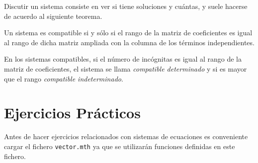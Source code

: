 \documentclass[a4paper]{article}
\begin{document}
Discutir un sistema consiste en ver si tiene soluciones y cuántas, y suele hacerse de acuerdo al siguiente teorema.

\begin{teorema}
Un sistema es compatible si y sólo si el rango de la matriz de coeficientes es igual al rango de dicha matriz ampliada con la columna de los términos independientes. 

En los sistemas compatibles, si el número de incógnitas es igual al rango de la matriz de coeficientes, el sistema se llama \emph{compatible determinado} y si es mayor que el rango \emph{compatible indeterminado}.
\end{teorema}


\section*{Ejercicios Prácticos}

Antes de hacer ejercicios relacionados con sistemas de ecuaciones es conveniente cargar el fichero \texttt{vector.mth} ya que se utilizarán funciones definidas en este fichero. 
\end{document}
